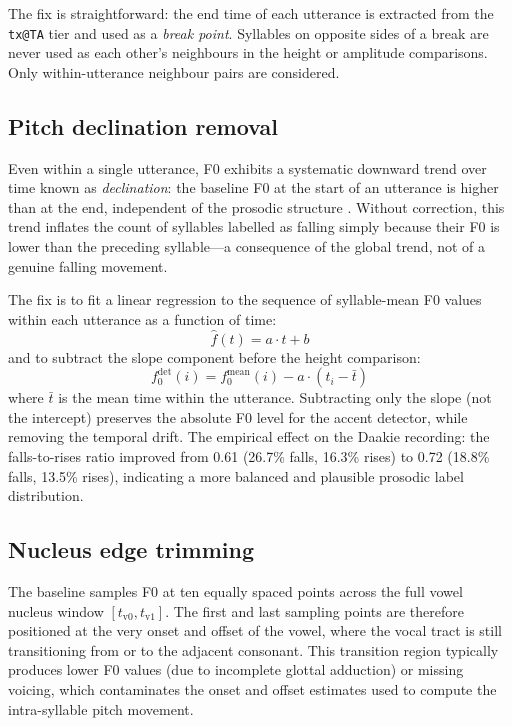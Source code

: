The fix is straightforward: the end time of each utterance is extracted from the
\texttt{tx@TA} tier and used as a \emph{break point}. Syllables on opposite
sides of a break are never used as each other's neighbours in the height or
amplitude comparisons. Only within-utterance neighbour pairs are considered.

\subsection{Pitch declination removal}

Even within a single utterance, F0 exhibits a systematic downward trend over
time known as \emph{declination}: the baseline F0 at the start of an utterance
is higher than at the end, independent of the prosodic structure
\cite{pierrehumbert1980phonology}. Without correction, this trend inflates the
count of syllables labelled as falling simply because their F0 is lower than
the preceding syllable---a consequence of the global trend, not of a genuine
falling movement.

The fix is to fit a linear regression to the sequence of syllable-mean F0
values within each utterance as a function of time:
\begin{equation}
  \hat{f}(t) = a \cdot t + b
\end{equation}
and to subtract the slope component before the height comparison:
\begin{equation}
  f_0^{\mathrm{det}}(i) = f_0^{\mathrm{mean}}(i) - a \cdot (t_i - \bar{t})
\end{equation}
where $\bar{t}$ is the mean time within the utterance. Subtracting only the
slope (not the intercept) preserves the absolute F0 level for the accent
detector, while removing the temporal drift. The empirical effect on the Daakie
recording: the falls-to-rises ratio improved from 0.61 (26.7\% falls,
16.3\% rises) to 0.72 (18.8\% falls, 13.5\% rises), indicating a more balanced
and plausible prosodic label distribution.

\subsection{Nucleus edge trimming}

The baseline samples F0 at ten equally spaced points across the full vowel
nucleus window $[t_{\mathrm{v0}}, t_{\mathrm{v1}}]$. The first and last
sampling points are therefore positioned at the very onset and offset of the
vowel, where the vocal tract is still transitioning from or to the adjacent
consonant. This transition region typically produces lower F0 values (due to
incomplete glottal adduction) or missing voicing, which contaminates the onset
and offset estimates used to compute the intra-syllable pitch movement.

